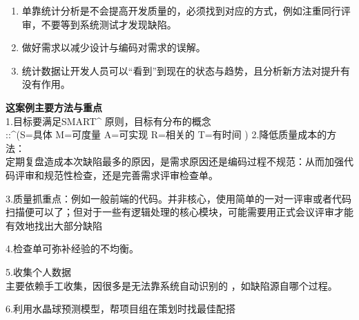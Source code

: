 \begin{enumerate}
\tightlist
\item
  单靠统计分析是不会提高开发质量的，必须找到对应的方式，例如注重同行评审，不要等到系统测试才发现缺陷。
\item
  做好需求以减少设计与编码对需求的误解。
\item
  统计数据让开发人员可以``看到''到现在的状态与趋势，且分析新方法对提升有没有作用。
\end{enumerate}

\textbf{这案例主要方法与重点}\\
1.目标要满足SMART\^{} 原则，目标有分布的概念\\
::\^{}(S=具体 M=可度量 A=可实现 R=相关的 T=有时间 )
2.降低质量成本的方法：\\
定期复盘造成本次缺陷最多的原因，是需求原因还是编码过程不规范：从而加强代码评审和规范性检查，还是完善需求评审检查单。

3.质量抓重点：例如一般前端的代码。并非核心，使用简单的一对一评审或者代码扫描便可以了；但对于一些有逻辑处理的核心模块，可能需要用正式会议评审才能有效地找出大部分缺陷

4.检查单可弥补经验的不均衡。

5.收集个人数据\\
主要依赖手工收集，因很多是无法靠系统自动识别的 ，如缺陷源自哪个过程。

6.利用水晶球预测模型，帮项目组在策划时找最佳配搭


\cite{MA2References1}

